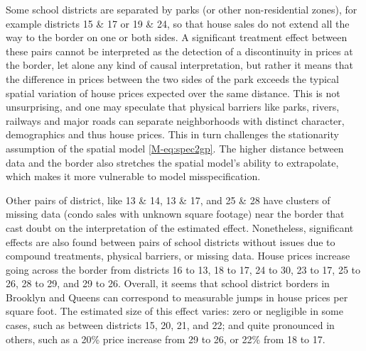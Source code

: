 \documentclass[letter,12pt]{article}
\begin{document}
Some school districts are separated by parks (or other non-residential zones), for example districts 15 \& 17 or 19 \& 24, so that house sales do not extend all the way to the border on one or both sides.
A significant treatment effect between these pairs cannot be interpreted as the detection of a discontinuity in prices at the border, let alone any kind of causal interpretation, but rather it means that the difference in prices between the two sides of the park exceeds the typical spatial variation of house prices expected over the same distance.
This is not unsurprising, and one may speculate that physical barriers like parks, rivers, railways and major roads can separate neighborhoods with distinct character, demographics and thus house prices.
This in turn challenges the stationarity assumption of the spatial model \autoref*{M-eq:spec2gp}.
The higher distance between data and the border also stretches the spatial model's ability to extrapolate, which makes it more vulnerable to model misspecification.

Other pairs of district, like 13 \& 14, 13 \& 17, and 25 \& 28 have clusters of missing data (condo sales with unknown square footage) near the border that cast doubt on the interpretation of the estimated effect.
Nonetheless, significant effects are also found between pairs of school districts without issues due to compound treatments, physical barriers, or missing data.
House prices increase going across the border from districts 16 to 13, 18 to 17, 24 to 30, 23 to 17, 25 to 26, 28 to 29, and 29 to 26.
Overall, it seems that school district borders in Brooklyn and Queens can correspond to measurable jumps in house prices per square foot.
The estimated size of this effect varies: zero or negligible in some cases, such as between districts 15, 20, 21, and 22; and quite pronounced in others, such as a 20\% price increase from 29 to 26, or 22\% from 18 to 17.


\end{document}
